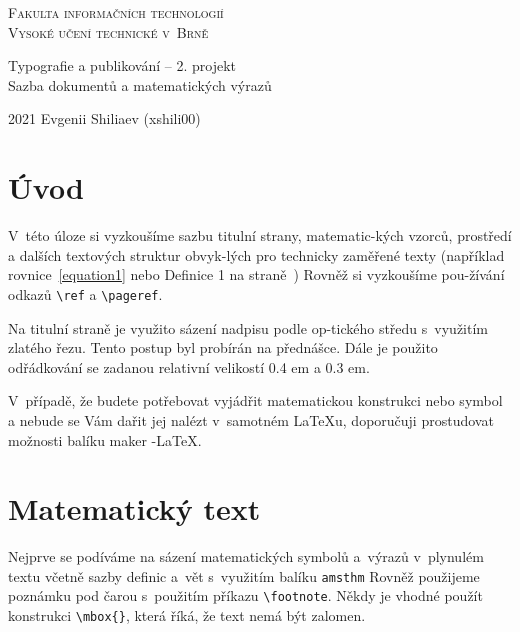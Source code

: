 \documentclass[a4paper, twocolumn, 11pt]{article}
\begin{document}
\begin{titlepage}
	\begin{center}
		\Huge
		\textsc{Fakulta informačních technologií\\Vysoké učení technické v~Brně}


		\LARGE
		Typografie a publikování – 2. projekt\\
		Sazba dokumentů a matematických výrazů


		\Large
		2021 \hfill Evgenii Shiliaev (xshili00)

	\end{center}
\end{titlepage}

\section*{Úvod}

V~této úloze si vyzkoušíme sazbu titulní strany, matematic-kých vzorců, prostředí a dalších textových struktur obvyk-lých pro technicky zaměřené texty (například rovnice~\eqref{equation1} nebo Definice 1 na straně~\pageref{definice1})
Rovněž si vyzkoušíme pou-žívání odkazů \verb|\ref| a \verb|\pageref|.

Na titulní straně je využito sázení nadpisu podle op-tického středu s~využitím zlatého řezu.
Tento postup byl probírán na přednášce.
Dále je použito odřádkování se zadanou relativní velikostí 0.4 em a 0.3 em.

V~případě, že budete potřebovat vyjádřit matematickou konstrukci nebo symbol a nebude se Vám dařit jej nalézt v~samotném \LaTeX u, doporučuji prostudovat možnosti balíku maker \AmS-\LaTeX.

\section{Matematický text}
Nejprve se podíváme na sázení matematických symbolů a~výrazů v~plynulém textu včetně sazby definic a~vět s~využitím balíku \verb|amsthm|
Rovněž použijeme poznámku pod čarou s~použitím příkazu \verb|\footnote|.
Někdy je vhodné použít konstrukci \verb|\mbox{}|, která říká, že text nemá být zalomen.
\end{document}
